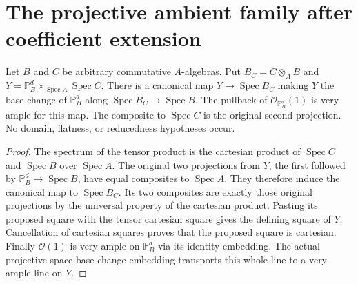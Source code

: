\section{The projective ambient family after coefficient extension}

\begin{lemma}
\label{lem:kn-relative-arithmetic-ambient-base-change}
\leanok
Let $B$ and $C$ be arbitrary commutative $A$-algebras.  Put
$B_C=C\otimes_A B$ and
$Y=\mathbb P_B^d\times_{\operatorname{Spec}A}\operatorname{Spec}C$.
There is a canonical map $Y\to\operatorname{Spec}B_C$ making $Y$
the base change of $\mathbb P_B^d$ along
$\operatorname{Spec}B_C\to\operatorname{Spec}B$.  The pullback of
$\mathcal O_{\mathbb P_B^d}(1)$ is very ample for this map.  The
composite to $\operatorname{Spec}C$ is the original second projection.
No domain, flatness, or reducedness hypotheses occur.
\end{lemma}
\begin{proof}
The spectrum of the tensor product is the cartesian product of
$\operatorname{Spec}C$ and $\operatorname{Spec}B$ over
$\operatorname{Spec}A$.  The original two projections from $Y$, the
first followed by $\mathbb P_B^d\to\operatorname{Spec}B$, have equal
composites to $\operatorname{Spec}A$.  They therefore induce the
canonical map to $\operatorname{Spec}B_C$.  Its two composites are
exactly those original projections by the universal property of the
cartesian product.  Pasting its proposed square with the tensor
cartesian square gives the defining square of $Y$.  Cancellation of
cartesian squares proves that the proposed square is cartesian.
Finally $\mathcal O(1)$ is very ample on $\mathbb P_B^d$ via its
identity embedding.  The actual projective-space base-change
embedding transports this whole line to a very ample line on $Y$.
\end{proof}
